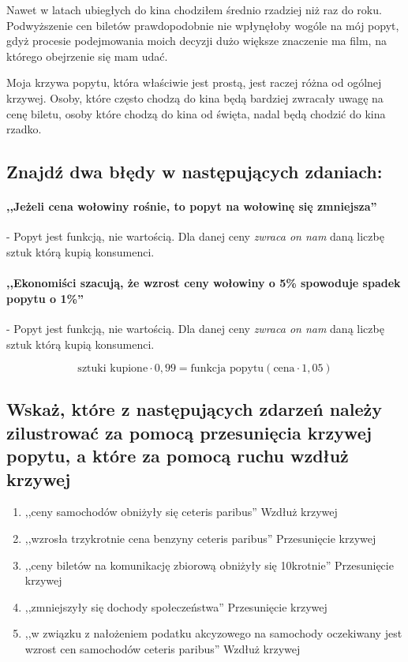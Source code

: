 \documentclass[a4paper,12pt]{article}
\begin{document}
Nawet w latach ubiegłych do kina chodziłem średnio rzadziej niż raz do roku. Podwyższenie cen biletów prawdopodobnie nie wpłynęłoby wogóle na mój popyt, gdyż procesie podejmowania moich decyzji dużo większe znaczenie ma film, na którego obejrzenie się mam udać.

Moja krzywa popytu, która właściwie jest prostą, jest raczej różna od ogólnej krzywej. Osoby, które często chodzą do kina będą bardziej zwracały uwagę na cenę biletu, osoby które chodzą do kina od święta, nadal będą chodzić do kina rzadko.

\subsection{Znajdź dwa błędy w następujących zdaniach:}

\paragraph*{,,Jeżeli cena wołowiny rośnie, to popyt na wołowinę się zmniejsza''} - Popyt jest funkcją, nie wartością. Dla danej ceny \emph{zwraca on nam} daną liczbę sztuk którą kupią konsumenci.

\paragraph*{,,Ekonomiści szacują, że wzrost ceny wołowiny o 5\% spowoduje spadek popytu o 1\%''} -  Popyt jest funkcją, nie wartością. Dla danej ceny \emph{zwraca on nam} daną liczbę sztuk którą kupią konsumenci.

\[
	\text{sztuki kupione} \cdot 0,99 = \text{funkcja popytu}\left(\text{cena} \cdot 1,05 \right)
\]

\subsection{Wskaż, które z następujących zdarzeń należy zilustrować za pomocą przesunięcia krzywej popytu, a które za pomocą ruchu wzdłuż krzywej}

\begin{enumerate}
	\item ,,ceny samochodów obniżyły się ceteris paribus'' Wzdłuż krzywej
	\item ,,wzrosła trzykrotnie cena benzyny ceteris paribus'' Przesunięcie krzywej
	\item ,,ceny biletów na komunikację zbiorową obniżyły się 10krotnie'' Przesunięcie krzywej
	\item ,,zmniejszyły się dochody społeczeństwa'' Przesunięcie krzywej
	\item ,,w związku z nałożeniem podatku akcyzowego na samochody oczekiwany jest wzrost cen samochodów ceteris paribus'' Wzdłuż krzywej
\end{enumerate}
\end{document}
